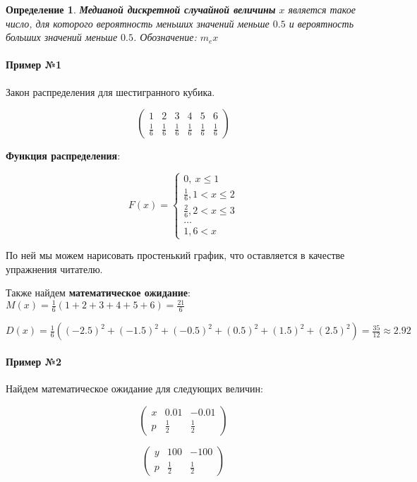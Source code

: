 \documentclass{article}
\newtheorem{definition}{Определение}
\begin{document}
\begin{definition}
    \textbf{Медианой дискретной случайной величины} $x$ является такое число, для которого вероятность меньших значений меньше $0.5$ и вероятность больших значений меньше $0.5$. Обозначение: $m_{e} x$
\end{definition}


\paragraph{Пример №1}

Закон распределения для шестигранного кубика.

$$
\begin{pmatrix}
  1 & 2 & 3 & 4 & 5 & 6 \\
  \frac{1}{6} & \frac{1}{6} & \frac{1}{6} & \frac{1}{6} & \frac{1}{6} & \frac{1}{6}
\end{pmatrix}
$$

\textbf{Функция распределения}:

$$F(x) = \begin{cases}
    0, \ x \le 1 \\
    \frac{1}{6}, 1 < x \le 2 \\
    \frac{2}{6}, 2 < x \le 3 \\
    \dots \\
    1, 6 < x
\end{cases}
$$

По ней мы можем нарисовать простенький график, что оставляется в качестве упражнения читателю.

Также найдем \textbf{математическое ожидание}: $M(x) = \frac{1}{6} (1 + 2 + 3 + 4 + 5 + 6) = \frac{21}{6}$

$D(x) = \frac{1}{6} ((-2.5)^2 + (-1.5)^2 + (-0.5)^2 + (0.5)^2 + (1.5)^2 + (2.5)^2) = \frac{35}{12} \approx 2.92$

\paragraph{Пример №2}

Найдем математическое ожидание для следующих величин:

$$
\begin{pmatrix}
    x & 0.01 & -0.01 \\
    p & \frac{1}{2} & \frac{1}{2}
\end{pmatrix}
$$


$$
\begin{pmatrix}
    y & 100 & -100 \\
    p & \frac{1}{2} & \frac{1}{2}
\end{pmatrix}
$$
\end{document}
